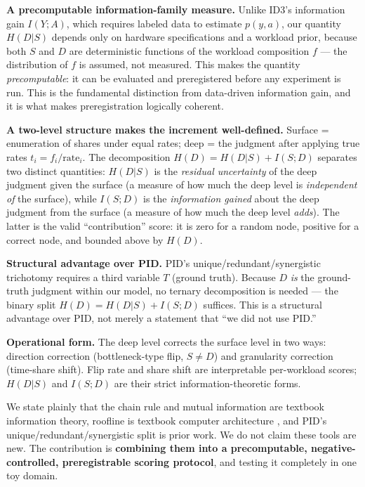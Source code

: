 \documentclass[10pt]{article}
\begin{document}
\textbf{A precomputable information-family measure.} Unlike ID3's information gain $I(Y;A)$, which requires labeled data to estimate $p(y,a)$, our quantity $H(D|S)$ depends only on hardware specifications and a workload prior, because both $S$ and $D$ are deterministic functions of the workload composition $f$ --- the distribution of $f$ is assumed, not measured. This makes the quantity \emph{precomputable}: it can be evaluated and preregistered before any experiment is run. This is the fundamental distinction from data-driven information gain, and it is what makes preregistration logically coherent.

\textbf{A two-level structure makes the increment well-defined.} Surface = enumeration of shares under equal rates; deep = the judgment after applying true rates $t_i=f_i/\mathrm{rate}_i$. The decomposition $H(D)=H(D|S)+I(S;D)$ separates two distinct quantities: $H(D|S)$ is the \emph{residual uncertainty} of the deep judgment given the surface (a measure of how much the deep level is \emph{independent of} the surface), while $I(S;D)$ is the \emph{information gained} about the deep judgment from the surface (a measure of how much the deep level \emph{adds}). The latter is the valid ``contribution'' score: it is zero for a random node, positive for a correct node, and bounded above by $H(D)$.

\textbf{Structural advantage over PID.} PID's unique/redundant/synergistic trichotomy requires a third variable $T$ (ground truth). Because $D$ \emph{is} the ground-truth judgment within our model, no ternary decomposition is needed --- the binary split $H(D)=H(D|S)+I(S;D)$ suffices. This is a structural advantage over PID, not merely a statement that ``we did not use PID.''

\textbf{Operational form.} The deep level corrects the surface level in two ways: direction correction (bottleneck-type flip, $S\neq D$) and granularity correction (time-share shift). Flip rate and share shift are interpretable per-workload scores; $H(D|S)$ and $I(S;D)$ are their strict information-theoretic forms.

We state plainly that the chain rule and mutual information are textbook information theory, roofline is textbook computer architecture \citep{roofline2009}, and PID's unique/redundant/synergistic split is prior work. We do not claim these tools are new. The contribution is \textbf{combining them into a precomputable, negative-controlled, preregistrable scoring protocol}, and testing it completely in one toy domain.
\end{document}
